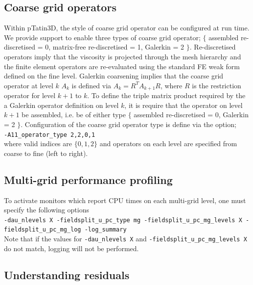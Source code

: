 \documentclass[paper=a4, fontsize=11pt,twoside]{scrartcl}
\newcommand{\ptat}{{{\sc pTatin3D}}}
\newcommand{\shellcmd}[1]{\\\indent\indent\texttt{\hspace{5mm}\footnotesize #1}\\}
\newcommand{\unix}[1]{\texttt{\footnotesize #1}}
\begin{document}
{{\subsection{Coarse grid operators}
Within {\ptat}, the style of coarse grid operator can be configured at run time. We provide support to enable three types of coarse grid operator; $\{$ assembled re-discretised = 0, matrix-free re-discretised = 1, Galerkin = 2 $\}$. Re-discretised operators imply that the viscosity is projected through the mesh hierarchy and the finite element operators are re-evaluated using the standard FE weak form defined on the fine level. Galerkin coarsening implies that the coarse grid operator at level $k$ $A_k$ is defined via $A_k = R^T A_{k+1} R$, where $R$ is the restriction operator for level $k+1$ to $k$. To define the triple matrix product required by the a Galerkin operator definition on level $k$, it is require that the operator on level $k+1$ be assembled, i.e. be of either type $\{$ assembled re-discretised = 0, Galerkin = 2 $\}$. Configuration of the coarse grid operator type is define via the option;
\shellcmd{-A11\_operator\_type 2,2,0,1}
where valid indices are $\{ 0, 1, 2 \}$ and operators on each level are specified from coarse to fine (left to right).

\subsection{Multi-grid performance profiling}
To activate monitors which report CPU times on each multi-grid level, one must specify the following options
\shellcmd{-dau\_nlevels X -fieldsplit\_u\_pc\_type mg -fieldsplit\_u\_pc\_mg\_levels X -fieldsplit\_u\_pc\_mg\_log -log\_summary}
Note that if the values for \unix{-dau\_nlevels X} and \unix{-fieldsplit\_u\_pc\_mg\_levels X} do not match, logging will not be performed.


\subsection{Understanding residuals}

}}
\end{document}
